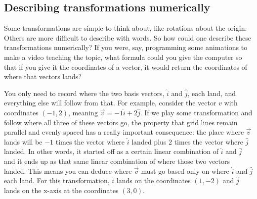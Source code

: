 \subsection{Describing transformations numerically}

Some transformations are simple to think about, like rotations about the origin.
Others are more difficult to describe with words. So how could one describe
these transformations numerically? If you were, say, programming some animations
to make a video teaching the topic, what formula could you give the computer so
that if you give it the coordinates of a vector, it would return the coordinates
of where that vectors lands?

\begin{bookfigure}
\end{bookfigure}

You only need to record where the two basis vectors, $\hat{i}$ and $\hat{j}$,
each land, and everything else will follow from that. For example, consider the
vector $v$ with coordinates $(-1, 2)$, meaning $\vec{v} = -1\hat{i} + 2\hat{j}$.
If we play some transformation and follow where all three of these vectors go,
the property that grid lines remain parallel and evenly spaced has a really
important consequence: the place where $\vec{v}$ lands will be $-1$ times the
vector where $\hat{i}$ landed plus $2$ times the vector where $\hat{j}$ landed.
In other words, it started off as a certain linear combination of $\hat{i}$ and
$\hat{j}$ and it ends up as that same linear combination of where those two
vectors landed. This means you can deduce where $\vec{v}$ must go based only on
where $\hat{i}$ and $\hat{j}$ each land. For this transformation, $\hat{i}$
lands on the coordinates $(1, -2)$ and $\hat{j}$ lands on the x-axis at the
coordinates $(3, 0)$.

